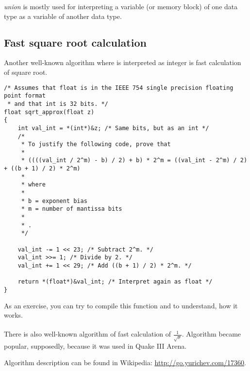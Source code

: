 
\CCpp \emph{union} is mostly used for interpreting a variable (or memory block) of one data type as a variable of another data type.





\subsection{Fast square root calculation}

Another well-known algorithm where \Tfloat is interpreted as integer is fast calculation of square root.

\begin{lstlisting}[caption=The source code is taken from Wikipedia: \url{http://go.yurichev.com/17364},style=customc]
/* Assumes that float is in the IEEE 754 single precision floating point format
 * and that int is 32 bits. */
float sqrt_approx(float z)
{
    int val_int = *(int*)&z; /* Same bits, but as an int */
    /*
     * To justify the following code, prove that
     *
     * ((((val_int / 2^m) - b) / 2) + b) * 2^m = ((val_int - 2^m) / 2) + ((b + 1) / 2) * 2^m)
     *
     * where
     *
     * b = exponent bias
     * m = number of mantissa bits
     *
     * .
     */
 
    val_int -= 1 << 23; /* Subtract 2^m. */
    val_int >>= 1; /* Divide by 2. */
    val_int += 1 << 29; /* Add ((b + 1) / 2) * 2^m. */
 
    return *(float*)&val_int; /* Interpret again as float */
}
\end{lstlisting}

As an exercise, you can try to compile this function and to understand, how it works. \\
\\
There is also well-known algorithm of fast calculation of $\frac{1}{\sqrt{x}}$.
Algorithm became popular, supposedly, because it was used in Quake III Arena.

Algorithm description can be found in Wikipedia: \url{http://go.yurichev.com/17360}.

